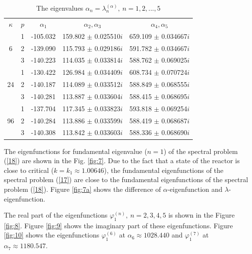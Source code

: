 \documentclass[authoryear]{elsarticle}
\begin{document}
\begin{table}[htp]
\caption{The eigenvalues $\alpha_n = \lambda_n^{(\alpha )}, \ n = 1,2, ..., 5$}
\label{t-3}
\begin{center}
\begin{tabular}{ccccc}
\rowcolor{col1}
$\kappa$ & $p$ & $\alpha_1$ &  $\alpha_2, \alpha_3$ &  $\alpha_4, \alpha_5$ \\ 
\rowcolor{col3}
   & 1 & -105.032 & 159.802 $\pm$ 0.025510$i$  & 659.109 $\pm$ 0.034667$i$  \\
\rowcolor{col2}
6  & 2 & -139.090 & 115.793 $\pm$ 0.029186$i$  & 591.782 $\pm$ 0.034667$i$  \\
\rowcolor{col1}
   & 3 & -140.223 & 114.035 $\pm$ 0.033814$i$  & 588.762 $\pm$ 0.069025$i$  \\
\rowcolor{col3}
   & 1 & -130.422 & 126.984 $\pm$ 0.034409$i$  & 608.734 $\pm$ 0.070724$i$  \\
\rowcolor{col2}
24 & 2 & -140.187 & 114.089 $\pm$ 0.033512$i$  & 588.849 $\pm$ 0.068555$i$  \\
\rowcolor{col1}
   & 3 & -140.281 & 113.887 $\pm$ 0.033604$i$  & 588.415 $\pm$ 0.068695$i$  \\
\rowcolor{col3}
   & 1 & -137.704 & 117.345 $\pm$ 0.033823$i$  & 593.818 $\pm$ 0.069254$i$  \\
\rowcolor{col2}
96 & 2 & -140.284 & 113.886 $\pm$ 0.033599$i$  & 588.419 $\pm$ 0.068687$i$  \\
\rowcolor{col1}
   & 3 & -140.308 & 113.842 $\pm$ 0.033603$i$  & 588.336 $\pm$ 0.068690$i$  \\
\end{tabular}
\end{center}
\end{table}

The eigenfunctions for fundamental eigenvalue ($n=1$) of the spectral problem (\ref{18}) are shown in the Fig. \ref{fig:7}. Due to the fact that a state of the reactor is close to critical ($k = k_1 \approx  1.00646$), the fundamental eigenfunctions of the spectral problem (\ref{17}) are close to the fundamental eigenfunctions of the spectral problem (\ref{18}).
Figure \ref{fig:7a} shows the difference of $\alpha$-eigenfunction and $\lambda$-eigenfunction.  


The real part of the eigenfunctions $\varphi^{(n)}_1, \ n = 2,3,4,5$ is shown in the Figure \ref{fig:8}.
Figure \ref{fig:9} shows the imaginary part of these eigenfunctions.
Figure \ref{fig:10} shows the eigenfunctions $\varphi^{(6)}_1$ at $\alpha_6 \approx  1028.440$ and 
$\varphi^{(7)}_1$ at $\alpha_7 \approx  1180.547$.
\end{document}

